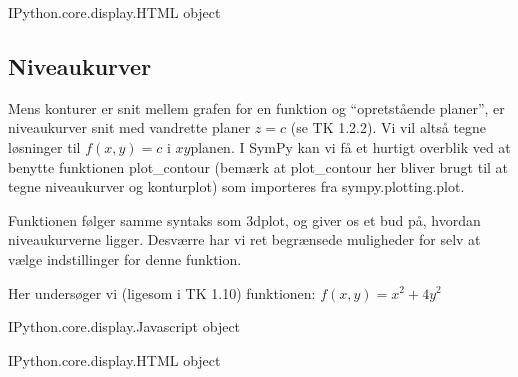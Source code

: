 \documentclass[letterpaper,10pt,english]{jupyterBook}
\begin{document}
\begin{sphinxVerbatim}[commandchars=\\\{\}]
\PYGZlt{}IPython.core.display.HTML object\PYGZgt{}
\end{sphinxVerbatim}


\subsection{Niveaukurver}
\label{\detokenize{notebooks/sympy/Notebook_FlereVar_plot:niveaukurver}}
Mens konturer er snit mellem grafen for en funktion og “opretstående planer”, er niveaukurver snit med vandrette planer \(z=c\) (se TK 1.2.2). Vi vil altså tegne løsninger til \(f(x,y) = c\) i \(xy\)\sphinxhyphen{}planen. I SymPy kan vi få et hurtigt overblik ved at benytte funktionen plot\_contour (bemærk at plot\_contour her bliver brugt til at tegne niveaukurver og  konturplot) som importeres fra sympy.plotting.plot.

Funktionen følger samme syntaks som 3dplot, og giver os et bud på, hvordan niveaukurverne ligger. Desværre har vi ret begrænsede muligheder for selv at vælge indstillinger for denne funktion.

Her undersøger vi (ligesom i TK 1.10) funktionen:
\( f(x, y) = x^2 + 4y^2 \)

\begin{sphinxVerbatim}[commandchars=\\\{\}]
   
          

        
\end{sphinxVerbatim}

\begin{sphinxVerbatim}[commandchars=\\\{\}]
\PYGZlt{}IPython.core.display.Javascript object\PYGZgt{}
\end{sphinxVerbatim}

\begin{sphinxVerbatim}[commandchars=\\\{\}]
\PYGZlt{}IPython.core.display.HTML object\PYGZgt{}
\end{sphinxVerbatim}
\end{document}
